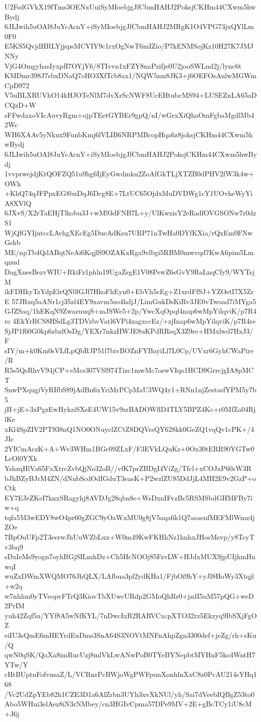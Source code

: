 U2FsdGVkX19fTms3OENxUuiSyMIoebjgJfCbmHAHJ2PoksjCKHm44CXwm5hwBydj
6JLIwih5uOAl8JuYcAcnY+iSyMIoebjgJfCbmHAHJ2MRgK1O4VPG73jxQYlLm0F0
E5KS5QvjdHRLYjjspsMCVIY9c1rxOgNwT6mIZio/P7kENMSojKz10H27K7JMJNNy
VjG4OmgyhasIyxpfI7OYjY6/8TIvvn1xFZY8naPzifje0U2jooSWLnd2j/lync6t
KMDmr398J7sbxDNaQ7oHO3XfTcb8ax1/NQW5zm8JK3+j6OEFOsAulwMGWmCpD972
V5uBLXRUVhO14kHJOTeNlM7dvXrScNWF8UcEHtubcMS94+LUSEZnLA65aDCQzD+W
sFFwdaxoVIcAuvyRgm+ojpTEetGYBEr9gpQ/nI/wGrxXiQhaOmFgbaMgdlMb42Wc
WH6XAAv5yNkux9FunbKmj6lVLIB6NRPMBcopHqa6z8joksjCKHm44CXwm5hwBydj
6JLIwih5uOAl8JuYcAcnY+iSyMIoebjgJfCbmHAHJ2PoksjCKHm44CXwm5hwBydj
1vvprwejdjKtQOFZQ51u9hg6IjEyGwdmku2ZoAfGkTLjXTZB0dPHV2fW3k4w+OWh
+KhQ74qJFPpxEG8bxDqJ6Dcg8E+7LtUC65OjdxMuDVDWg1cY1UOvheWyYiA8XVlQ
6JXvS/X2rTaEHjTlkobu3J+wM93dFNB7L+y/UlKwzisY2eRadfOVGSONw7r0dzS1
WjQlGYIjutccLAvhgXEcEg5DueAdKsu7URP71nTwHa0DYfKXia/rQxEm0FNwGskb
ME/npTb4QdABqtNeAi6KqjlS9OZAKxRga9vlbgi5RBM0mwvqd7KwA6pim5Lmqnud
DagXnesBezvWIU+RkiFz1phln19UgaZsgE1V08PewZ6sGvY9RaLnqCfy9/WYTsjM
ikFDHkyTzYdpElrQN0lGJf7HkoFhEyn0+EbVh5cEg+Z1xrdFfSJ+YZOstI7X5ZrE
57JRxq5aANr1cj35zl4EY9xavm5zo4hdjJ/LimGukDsKiRv3JE0vTwoad7iMYga5
GJZSaq/1hEKqN9ZwazuuqS+mJSWe5+2p/YwcXqOpqf4nap6wMpYilqviK/p7R4re
4EkYrRCS8HSdLg3TDVzbvVatl6VPi4zagxccEz/+zjInap6wMpYilqviK/p7R4re
SjJP1f60G0kp6zbzlOsDg/YEXr7nkzIIWJE8uKPdRRsqX3Z9re+HMxlwd7HxJ3/F
sIY/m+k0Km0sVLfLpQbRJP51l7bivBOZnFYBayiLl7L0Cp/UVxr6GyhCWaPire/R
R5s5QsRhvV94jCP+eMcs307VSl974Tizc1mwMc7oswVIqo1HCD9GrrcjgIA8pMCT
SnwPXqugiVyRIfbS89jAdBn6xYriMrPCpMaU3WQ4y1+RNn1njZestasfYPM5y7b5
jH+jE+3xPgzEwHykziSXsE4UW15v9zrBADOWflD4TLY5BPZ4Kc+r0MfZa04RjlKe
xKl4SpZIV2PT938nQ1NO0ONuyclZCtZ8DQVrsQY628kk0GeZQ1vqQv1cPK+/4JIc
2YICmAczK+A+Wv3WHm1BGc09ZLxF/F3EVkLQuKz+0Ox30tERR90YGTw0LcOl0YXk
YshzqHlVa65FxXtrcZvbQjNe32oB//vfK7prZBDgI4ViZg/Tfcl+xCOJxP60sW3R
bJhBZyBJrM4ZN/dNnbScdOdIGduT3easK+P2wzlZU85DdJjL4MH2E9v2GzP+oCtk
EY7EJeZKeI7knxSRagyhj8AVDJg28qbn8e+WsDxnIFvzBc5RSMSbdGHMFBy7iw+q
tqfa5M3wEDY8wO4pr60gZGC9yOaWxMU0g8jV5aqa6k1Q7asaenfMEFMlWmz4jZOe
7BpOuUFp2T3eerwJhUuWZbLux+W0m49KwFKHhNz1hnhxJHosMsvp/y8TeyTv3bq9
sDxIeMs9yogn7oyhRGjSILmhDz+Ch5HcNOOj85FzvLW+HJdxMUX9jpUIjkmHnwqI
wuZxDWmXWQMO76JhQLX/LAfbua3pl2ydKHa1/FjbOi9hY+yJl8HoWy3Xtqjl+w2q
w7nhhm0yTVeopvFTrQ3KiovTbXUwcURdp2GMoQhRr0+jzdI5uM57pQG+weD2PrIM
yuh42Zqf5u/YYf8A5wNfKYL/7nDwcIxR2RARVCxcpXTO32rz5Ekzyq9IbSXjFgOZ
eiIU3sQmE6mHEYrdEuDms3SnA64S3NOVtMNFnAhpZgn3300def+jeZg/rh+sKu/Q
qwN0qSK/QaXa8imRucUzj8mlVkLwANwPoB0TYeBYNepbtMYHnF5ko4WntH7YTw/Y
cHtBUptnFofvnsaZ/L/VCRnrPcBWjoWgPWFpunXonhlnXxC8z0PcAU214sYHq168
/Vc2UdZpYEb82h1CZE3D1a6AlZrbn3UYh3xvXkNUl/yh/Sai7dVeebIQBgZ53to0
Abo5WHui3elAez8iN3rNMbey/cn3HGIvCpma57DPe9MV+2E+gBcTCy1iU8cM+J6j
